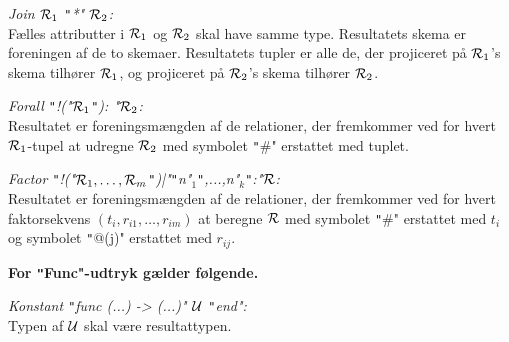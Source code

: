 \documentclass{article}
\begin{document}
{\em Join ${\cal R}_1$ \texttt"*" ${\cal R}_2$:}\\
F\ae{}lles attributter i ${\cal R}_1$ og ${\cal R}_2$ skal have samme type.
Resultatets skema er foreningen af de to skemaer. 
Resultatets tupler er alle de, der projiceret p\aa{}
${\cal R}_1$'s skema tilh\o{}rer ${\cal R}_1$, og projiceret p\aa{}
${\cal R}_2$'s skema tilh\o{}rer ${\cal R}_2$.

{\em Forall \texttt"!("${\cal R}_1$\texttt"): "${\cal R}_2$:}\\
Resultatet er foreningsm\ae{}ngden af de relationer, 
der fremkommer ved for hvert
${\cal R}_1$-tupel at  udregne ${\cal R}_2$ med symbolet
\texttt"#" erstattet med tuplet.

{\em Factor \texttt"!("${\cal R}_1,\ldots,{\cal R}_m$\texttt")|"\texttt"n"$_1$\texttt",...,n"$_k$\texttt":"${\cal R}$:}\\
Resultatet er foreningsm\ae{}ngden af de relationer,
der fremkommer ved for hvert faktorsekvens $(t_i,r_{i1},\ldots,r_{im})$ at
beregne ${\cal R}$ med symbolet
\texttt"#" erstattet med $t_i$ og symbolet \texttt"@(j)" erstattet med $r_{ij}$.

{\bf For \texttt"Func"-udtryk g\ae{}lder f\o{}lgende.}

{\em Konstant \texttt"func (...) -> (...)" $\cal U$ \texttt"end":}\\
Typen af $\cal U$ skal v\ae{}re resultattypen.
\end{document}
